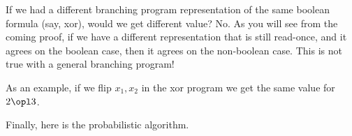
If we had a different branching program representation of the same boolean formula (say, xor), would we get different value? No. As you will see from the coming proof, if we have a different representation that is still read-once, and it agrees on the boolean case, then it agrees on the non-boolean case. This is not true with a general branching program!

As an example, if we flip $x_1,x_2$ in the xor program we get the same value for $2\opl 3$.



Finally, here is the probabilistic algorithm. 

